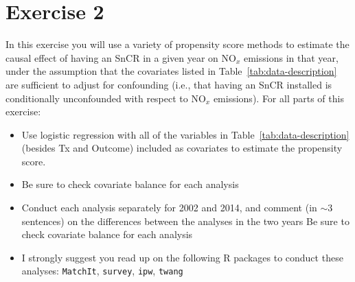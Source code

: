 
\section{Exercise 2}

\begin{quoting}
  In this exercise you will use a variety of propensity score methods
  to estimate the causal effect of having an SnCR in a given year on
  $\text{NO}_x$ emissions in that year, under the assumption that the
  covariates listed in Table~\ref{tab:data-description} are sufficient
  to adjust for confounding (i.e., that having an SnCR installed is
  conditionally unconfounded with respect to $\text{NO}_x$
  emissions). For all parts of this exercise:
  \begin{itemize}
  \item Use logistic regression with all of the variables in
    Table~\ref{tab:data-description} (besides Tx and Outcome) included
    as covariates to estimate the propensity score.
  \item Be sure to check covariate balance for each analysis
  \item Conduct each analysis separately for 2002 and 2014, and
    comment (in $\sim$3 sentences) on the differences between the analyses
    in the two years Be sure to check covariate balance for each
    analysis
  \item I strongly suggest you read up on the following R packages to
    conduct these analyses: \texttt{MatchIt}, \texttt{survey},
    \texttt{ipw}, \texttt{twang}
  \end{itemize}
\end{quoting}

